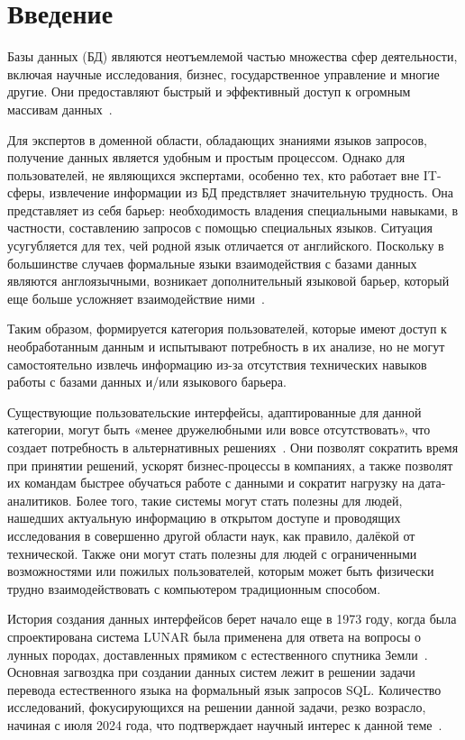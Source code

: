 \chapter*{Введение}
\label{sec:afterwords}

Базы данных (БД) являются неотъемлемой
частью множества сфер деятельности, включая научные исследования, бизнес,
государственное управление и многие другие. Они предоставляют быстрый и
эффективный доступ к огромным массивам данных~\cite{savoskinIssledovanieSposobovPrimeneniya2019}.

Для экспертов в доменной области,
обладающих знаниями языков запросов, получение данных является удобным и простым процессом.
Однако для пользователей, не являющихся экспертами, особенно тех, кто работает
вне IT-сферы, извлечение информации из БД предствляет значительную трудность.
Она представляет из себя барьер: необходимость владения специальными навыками,
в частности, составлению запросов с помощью специальных языков.
Ситуация усугубляется для тех, чей родной язык отличается от
английского. Поскольку в большинстве случаев формальные языки взаимодействия с базами
данных являются англоязычными, возникает дополнительный языковой барьер, который
еще больше усложняет взаимодействие
ними~\cite{karimiNaturalLanguageQuery2022,bolyabkinIntellektualnayaSistemaDlya2021}.

Таким образом, формируется категория пользователей, которые имеют доступ к
необработанным данным и испытывают потребность в их анализе, но не могут самостоятельно
извлечь информацию из-за отсутствия технических навыков работы с базами данных
и/или языкового барьера.

Существующие пользовательские интерфейсы, адаптированные для данной категории,
могут быть «менее дружелюбными или вовсе отсутствовать»,
что создает потребность в альтернативных решениях~\cite{karimiNaturalLanguageQuery2022}.
Они позволят сократить время при принятии решений, ускорят бизнес-процессы в компаниях,
а также позволят их командам быстрее обучаться работе с данными и сократит нагрузку на дата-аналитиков.
Более того, такие системы могут стать полезны для людей,
нашедших актуальную информацию в открытом доступе и проводящих исследования в совершенно другой
области наук, как правило, далёкой от технической.
Также они могут стать полезны для людей с ограниченными возможностями или
пожилых пользователей, которым может быть физически трудно взаимодействовать с компьютером
традиционным способом.

История создания данных интерфейсов берет начало еще в 1973 году, когда была спроектирована
система LUNAR была применена для ответа на вопросы о лунных породах, доставленных прямиком 
с естественного спутника Земли~\cite{zhuLargeLanguageModel2024}. Основная загвоздка при создании данных 
систем лежит в решении задачи перевода естественного языка на формальный язык запросов SQL.
Количество исследований, фокусирующихся на решении данной задачи, резко возрасло, начиная
с июля 2024 года, что подтверждает научный интерес к данной 
теме~\cite{huangExploringLandscapeTexttoSQL2025}.

